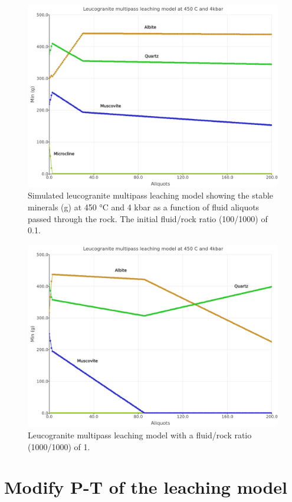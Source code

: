 \documentclass[
]{book}
\begin{document}
\begin{figure}
\includegraphics[width=1\linewidth]{figures/module4/fig-8} \caption{Simulated leucogranite multipass leaching model showing the stable minerals (g) at 450 °C and 4 kbar as a function of fluid aliquots passed through the rock. The initial fluid/rock ratio (100/1000) of 0.1.}\label{fig:fig-8d}
\end{figure}
\begin{figure}
\includegraphics[width=1\linewidth]{figures/module4/fig-9} \caption{Leucogranite multipass leaching model with a fluid/rock ratio (1000/1000) of 1.}\label{fig:fig-9d}
\end{figure}

\hypertarget{modify-p-t-of-the-leaching-model}{%
\section{Modify P-T of the leaching model}\label{modify-p-t-of-the-leaching-model}}
\end{document}
